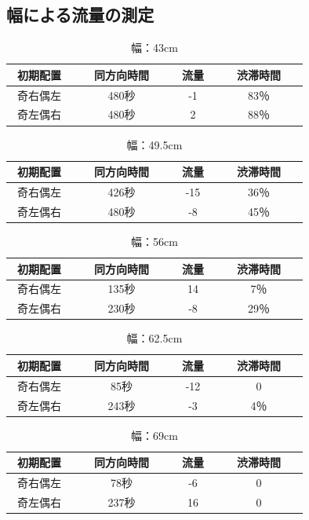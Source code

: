 \documentclass[twocolumn]{jarticle} %
\begin{document}
\subsection{幅による流量の測定}

\begin{table}[!ht]
\begin{center}
\begin{tabular}{|c|c|c|c|c|}
\hline
初期配置　&　同方向時間　&　流量　&　渋滞時間　\\
\hline
奇右偶左　&　480秒　&　-1　&　83％ \\
\hline
奇左偶右　&　480秒　&　2　&　88％ \\
\hline
\end{tabular}
\end{center}
\caption{
幅：43cm
}
\end{table}

\begin{table}[!ht]
\begin{center}
\begin{tabular}{|c|c|c|c|c|}
\hline
初期配置　&　同方向時間　&　流量　&　渋滞時間　\\
\hline
奇右偶左　&　426秒　&　-15　&　36％ \\
\hline
奇左偶右　&　480秒　&　-8　&　45％ \\
\hline
\end{tabular}
\end{center}
\caption{
幅：49.5cm
}
\end{table}

\begin{table}[!ht]
\begin{center}
\begin{tabular}{|c|c|c|c|c|}
\hline
初期配置　&　同方向時間　&　流量　&　渋滞時間　\\
\hline
奇右偶左　&　135秒　&　14　&　7％ \\
\hline
奇左偶右　&　230秒　&　-8　&　29％ \\
\hline
\end{tabular}
\end{center}
\caption{
幅：56cm
}
\end{table}

\begin{table}[!ht]
\begin{center}
\begin{tabular}{|c|c|c|c|c|}
\hline
初期配置　&　同方向時間　&　流量　&　渋滞時間　\\
\hline
奇右偶左　&　85秒　&　-12　&　0 \\
\hline
奇左偶右　&　243秒　&　-3　&　4％ \\
\hline
\end{tabular}
\end{center}
\caption{
幅：62.5cm
}
\end{table}

\begin{table}[!ht]
\begin{center}
\begin{tabular}{|c|c|c|c|c|}
\hline
初期配置　&　同方向時間　&　流量　&　渋滞時間　\\
\hline
奇右偶左　&　78秒　&　-6　&　0 \\
\hline
奇左偶右　&　237秒　&　16　&　0 \\
\hline
\end{tabular}
\end{center}
\caption{
幅：69cm
}
\end{table}
\end{document}
